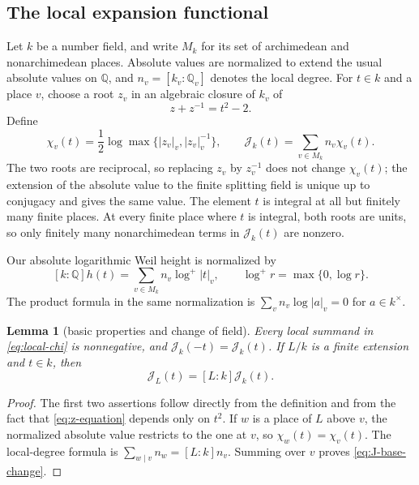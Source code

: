 \documentclass[11pt,reqno]{amsart}
\newtheorem{lemma}[theorem]{Lemma}
\theoremstyle{definition}
\theoremstyle{remark}
\newcommand{\Q}{\mathbb Q}
\newcommand{\cJ}{\mathcal J}
\begin{document}
\subsection{The local expansion functional}

Let \(k\) be a number field, and write \(M_k\) for its set of archimedean
and nonarchimedean places.  Absolute values are normalized to extend the
usual absolute values on \(\Q\), and \(n_v=[k_v:\Q_v]\) denotes the local
degree.  For \(t\in k\) and a place \(v\), choose a root
\(z_v\) in an algebraic closure of \(k_v\) of
\begin{equation}\label{eq:z-equation}
 z+z^{-1}=t^2-2.
\end{equation}
Define
\begin{equation}\label{eq:local-chi}
 \chi_v(t)=\frac12\log\max\{|z_v|_v,|z_v|_v^{-1}\},
 \qquad
 \cJ_k(t)=\sum_{v\in M_k}n_v\chi_v(t).
\end{equation}
The two roots are reciprocal, so replacing \(z_v\) by \(z_v^{-1}\) does
not change \(\chi_v(t)\); the extension of the absolute value to the finite
splitting field is unique up to conjugacy and gives the same value.  The
element \(t\) is integral at all but finitely many finite places.  At every
finite place where \(t\) is integral, both roots are units, so only finitely many
nonarchimedean terms in \(\cJ_k(t)\) are nonzero.

Our absolute logarithmic Weil height is normalized by
\begin{equation}\label{eq:height-normalization}
 [k:\Q]h(t)=\sum_{v\in M_k}n_v\log^+|t|_v,
 \qquad \log^+r=\max\{0,\log r\}.
\end{equation}
The product formula in the same normalization is
\(\sum_vn_v\log|a|_v=0\) for \(a\in k^\times\).

\begin{lemma}[basic properties and change of field]
\label{lem:J-base-change}
Every local summand in \eqref{eq:local-chi} is nonnegative, and
\(\cJ_k(-t)=\cJ_k(t)\).  If \(L/k\) is a finite extension and \(t\in k\),
then
\begin{equation}\label{eq:J-base-change}
 \cJ_L(t)=[L:k]\cJ_k(t).
\end{equation}
\end{lemma}

\begin{proof}
The first two assertions follow directly from the definition and from the
fact that \eqref{eq:z-equation} depends only on \(t^2\).  If \(w\) is a
place of \(L\) above \(v\), the normalized absolute value restricts to the
one at \(v\), so \(\chi_w(t)=\chi_v(t)\).  The local-degree formula is
\(\sum_{w\mid v}n_w=[L:k]n_v\).
Summing over \(v\) proves \eqref{eq:J-base-change}.
\end{proof}
\end{document}
